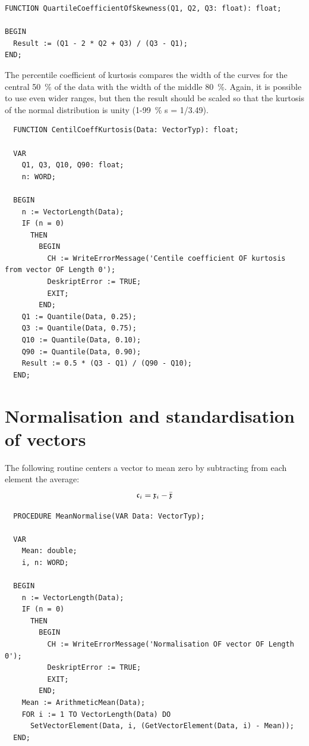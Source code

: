 \begin{refsection}
\begin{lstlisting}
FUNCTION QuartileCoefficientOfSkewness(Q1, Q2, Q3: float): float;

BEGIN
  Result := (Q1 - 2 * Q2 + Q3) / (Q3 - Q1);
END;
\end{lstlisting}

The percentile coefficient of kurtosis compares the width of the curves for the central \SI{50}{\%} of the data with the width of the middle \SI{80}{\%}. Again, it is possible to use even wider ranges, but then the result should be scaled so that the kurtosis of the normal distribution is unity (\num{1}-\SI{99}{\%} s = 1/3.49).

\begin{lstlisting}
  FUNCTION CentilCoeffKurtosis(Data: VectorTyp): float;

  VAR
    Q1, Q3, Q10, Q90: float;
    n: WORD;

  BEGIN
    n := VectorLength(Data);
    IF (n = 0)
      THEN
        BEGIN
          CH := WriteErrorMessage('Centile coefficient OF kurtosis from vector OF Length 0');
          DeskriptError := TRUE;
          EXIT;
        END;
    Q1 := Quantile(Data, 0.25);
    Q3 := Quantile(Data, 0.75);
    Q10 := Quantile(Data, 0.10);
    Q90 := Quantile(Data, 0.90);
    Result := 0.5 * (Q3 - Q1) / (Q90 - Q10);
  END;
\end{lstlisting}

\section{Normalisation and standardisation of vectors}

The following routine centers a vector to mean zero by subtracting from each element the average:
\begin{equation}
  \mathfrak{c}_{i} = \mathfrak{x}_{i} - \bar{\mathfrak{x}}
\end{equation}

\begin{lstlisting}
  PROCEDURE MeanNormalise(VAR Data: VectorTyp);

  VAR
    Mean: double;
    i, n: WORD;

  BEGIN
    n := VectorLength(Data);
    IF (n = 0)
      THEN
        BEGIN
          CH := WriteErrorMessage('Normalisation OF vector OF Length 0');
          DeskriptError := TRUE;
          EXIT;
        END;
    Mean := ArithmeticMean(Data);
    FOR i := 1 TO VectorLength(Data) DO
      SetVectorElement(Data, i, (GetVectorElement(Data, i) - Mean));
  END;
\end{lstlisting}


\end{refsection}
